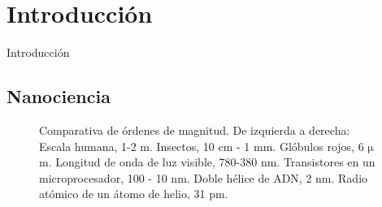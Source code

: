 \documentclass{beamer}
\begin{document}
	\section{Introducción}
	\begin{frame}{Introducción}
		\subsection{Nanociencia}
		\begin{figure}[h!]
			\centering
			\caption[Comparativa de ódenes de magnitud desde metros hasta picometros]{Comparativa de órdenes de magnitud. De izquierda a derecha: Escala humana, 1-2 m. Insectos, 10 cm - 1 mm. Glóbulos rojos, 6 $\mathrm{\mu}$m. Longitud de onda de luz visible, 780-380 nm. Transistores en un microprocesador, 100 - 10 nm. Doble hélice de ADN, 2 nm. Radio atómico de un átomo de helio, 31 pm.}
			\label{fig:scale}
		\end{figure}
	\end{frame}
\end{document}
